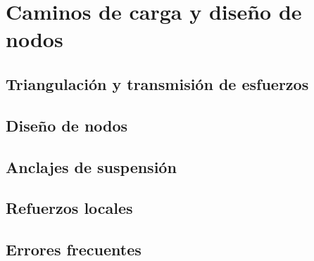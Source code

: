 \chapter{Caminos de carga y diseño de nodos}
\label{ch:caminos_carga_nodos}

\begin{objetivos}
  \item {}
  \item {}
  \item {}
\end{objetivos}


\section{Triangulación y transmisión de esfuerzos}
\label{sec:caminos_carga_nodos:01}

\section{Diseño de nodos}
\label{sec:caminos_carga_nodos:02}

\section{Anclajes de suspensión}
\label{sec:caminos_carga_nodos:03}

\section{Refuerzos locales}
\label{sec:caminos_carga_nodos:04}

\section{Errores frecuentes}
\label{sec:caminos_carga_nodos:05}


